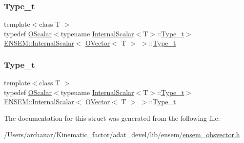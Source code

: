 \subsubsection{\texorpdfstring{Type\_t}{Type\_t}\hspace{0.1cm}{\footnotesize\ttfamily [1/2]}}
{\footnotesize\ttfamily template$<$class T $>$ \\
typedef \mbox{\hyperlink{classENSEM_1_1OScalar}{O\+Scalar}}$<$typename \mbox{\hyperlink{structENSEM_1_1InternalScalar}{Internal\+Scalar}}$<$T$>$\+::\mbox{\hyperlink{structENSEM_1_1InternalScalar_3_01OVector_3_01T_01_4_01_4_a61185c961c0397adc786d26e877adba9}{Type\+\_\+t}}$>$ \mbox{\hyperlink{structENSEM_1_1InternalScalar}{E\+N\+S\+E\+M\+::\+Internal\+Scalar}}$<$ \mbox{\hyperlink{classENSEM_1_1OVector}{O\+Vector}}$<$ T $>$ $>$\+::\mbox{\hyperlink{structENSEM_1_1InternalScalar_3_01OVector_3_01T_01_4_01_4_a61185c961c0397adc786d26e877adba9}{Type\+\_\+t}}}

\mbox{\label{structENSEM_1_1InternalScalar_3_01OVector_3_01T_01_4_01_4_a61185c961c0397adc786d26e877adba9}} 
\subsubsection{\texorpdfstring{Type\_t}{Type\_t}\hspace{0.1cm}{\footnotesize\ttfamily [2/2]}}
{\footnotesize\ttfamily template$<$class T $>$ \\
typedef \mbox{\hyperlink{classENSEM_1_1OScalar}{O\+Scalar}}$<$typename \mbox{\hyperlink{structENSEM_1_1InternalScalar}{Internal\+Scalar}}$<$T$>$\+::\mbox{\hyperlink{structENSEM_1_1InternalScalar_3_01OVector_3_01T_01_4_01_4_a61185c961c0397adc786d26e877adba9}{Type\+\_\+t}}$>$ \mbox{\hyperlink{structENSEM_1_1InternalScalar}{E\+N\+S\+E\+M\+::\+Internal\+Scalar}}$<$ \mbox{\hyperlink{classENSEM_1_1OVector}{O\+Vector}}$<$ T $>$ $>$\+::\mbox{\hyperlink{structENSEM_1_1InternalScalar_3_01OVector_3_01T_01_4_01_4_a61185c961c0397adc786d26e877adba9}{Type\+\_\+t}}}



The documentation for this struct was generated from the following file\+:\begin{DoxyCompactItemize}
\item 
/\+Users/archanar/\+Kinematic\+\_\+factor/adat\+\_\+devel/lib/ensem/\mbox{\hyperlink{lib_2ensem_2ensem__obsvector_8h}{ensem\+\_\+obsvector.\+h}}\end{DoxyCompactItemize}
